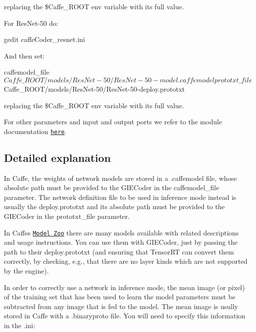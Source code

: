 replacing the {\ttfamily \$\+Caffe\+\_\+\+R\+O\+OT} env variable with its full value.

For {\ttfamily Res\+Net-\/50} do\+:


\begin{DoxyCode}
gedit caffeCoder\_resnet.ini
\end{DoxyCode}


And then set\+:


\begin{DoxyCode}
caffemodel\_file $Caffe\_ROOT/models/ResNet-50/ResNet-50-model.caffemodel
prototxt\_file $Caffe\_ROOT/models/ResNet-50/ResNet-50-deploy.prototxt
\end{DoxyCode}


replacing the {\ttfamily \$\+Caffe\+\_\+\+R\+O\+OT} env variable with its full value.

For other parameters and input and output ports we refer to the module documentation \href{http://robotology.github.io/himrep/doxygen/doc/html/group__GIECoder.html}{\tt here}.

\subsection*{Detailed explanation}

In Caffe, the weights of network models are stored in a {\ttfamily .caffemodel} file, whose absolute path must be provided to the {\ttfamily G\+I\+E\+Coder} in the {\ttfamily caffemodel\+\_\+file} parameter. The network definition file to be used in inference mode instead is usually the {\ttfamily deploy.\+prototxt} and its absolute path must be provided to the {\ttfamily G\+I\+E\+Coder} in the {\ttfamily prototxt\+\_\+file} parameter.

In Caffe\textquotesingle{}s \href{http://caffe.berkeleyvision.org/model_zoo.html}{\tt Model Zoo} there are many models available with related descriptions and usage instructions. You can use them with {\ttfamily G\+I\+E\+Coder}, just by passing the path to their {\ttfamily deploy.\+prototxt} (and ensuring that Tensor\+RT can convert them correctly, by checking, e.\+g., that there are no layer kinds which are not supported by the engine).

In order to correctly use a network in inference mode, the mean image (or pixel) of the training set that has been used to learn the model parameters must be subtracted from any image that is fed to the model. The mean image is usully stored in Caffe with a {\ttfamily .binaryproto} file. You will need to specify this information in the {\ttfamily .ini}\+:


